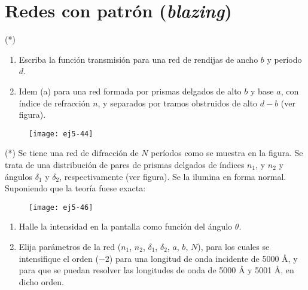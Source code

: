 \section*{Redes con patrón (\emph{blazing})}

\item (*)
\begin{enumerate}
\item Escriba la función transmisión para una red de rendijas de ancho $b$ y período $d$.
\item Idem (a) para una red formada por prismas delgados de alto $b$ y base $a$, con índice de refracción $n$, y separados por tramos obstruidos de alto $d-b$ (ver figura). 
\end{enumerate}
\begin{figure}[h]
	\centering{}\texttt{[image: ej5-44]}
\end{figure}






\item (*) Se tiene una red de difracción de $N$ períodos como se muestra en la figura.
Se trata de una distribución de pares de prismas delgados de índices $n_{1}$, y $n_{2}$ y ángulos $\delta_{1}$ y $\delta_{2}$, respectivamente (ver figura).
Se la ilumina en forma normal.
Suponiendo que la teoría fuese exacta:
\begin{figure}[h]
	\centering{}\texttt{[image: ej5-46]}
\end{figure}
\begin{enumerate}
	\item Halle la intensidad en la pantalla como función del ángulo $\theta$. 
	\item Elija parámetros de la red ($n_{1}$, $n_{2}$, $\delta_{1}$, $\delta_{2}$, $a$, $b$, $N$), para los cuales se intensifique el orden ($-2$) para una longitud de onda incidente de 5000 Å, y para que se puedan resolver las longitudes de onda de 5000 Å y 5001 Å, en dicho orden. 
\end{enumerate}


